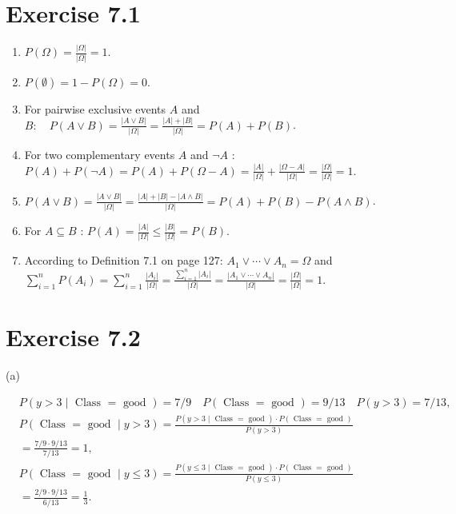 \documentclass[10pt]{book}
\begin{document}
\section*{Exercise 7.1}
\begin{enumerate}
  \item $P(\Omega)=\frac{|\Omega|}{|\Omega|}=1$.
  \item $P(\emptyset)=1-P(\Omega)=0$.
  \item For pairwise exclusive events $A$ and $B: \quad P(A \vee B)=\frac{|A \vee B|}{|\Omega|}=\frac{|A|+|B|}{|\Omega|}= P(A)+P(B)$.
  \item For two complementary events $A$ and $\neg A$ : $P(A)+P(\neg A)=P(A)+P(\Omega-A)= \frac{|A|}{|\Omega|}+\frac{|\Omega-A|}{|\Omega|}=\frac{|\Omega|}{|\Omega|}=1$.
  \item $P(A \vee B)=\frac{|A \vee B|}{|\Omega|}=\frac{|A|+|B|-|A \wedge B|}{|\Omega|}=P(A)+P(B)-P(A \wedge B)$.
  \item For $A \subseteq B$ : $P(A)=\frac{|A|}{|\Omega|} \leq \frac{|B|}{|\Omega|}=P(B)$.
  \item According to Definition 7.1 on page 127: $A_{1} \vee \cdots \vee A_{n}=\Omega$ and $\sum_{i=1}^{n} P\left(A_{i}\right)= \sum_{i=1}^{n} \frac{\left|A_{i}\right|}{|\Omega|}=\frac{\sum_{i=1}^{n}\left|A_{i}\right|}{|\Omega|}=\frac{\left|A_{1} \vee \cdots \vee A_{n}\right|}{|\Omega|}=\frac{|\Omega|}{|\Omega|}=1$.
\end{enumerate}


\section*{Exercise 7.2}
(a)

$$
\begin{aligned}
& P(y>3 \mid \text { Class }=\text { good })=7 / 9 \quad P(\text { Class }=\text { good })=9 / 13 \quad P(y>3)=7 / 13, \\
& P(\text { Class }=\text { good } \mid y>3)=\frac{P(y>3 \mid \text { Class }=\text { good }) \cdot P(\text { Class }=\text { good })}{P(y>3)} \\
& =\frac{7 / 9 \cdot 9 / 13}{7 / 13}=1, \\
& P(\text { Class }=\text { good } \mid y \leq 3)=\frac{P(y \leq 3 \mid \text { Class }=\text { good }) \cdot P(\text { Class }=\text { good })}{P(y \leq 3)} \\
& =\frac{2 / 9 \cdot 9 / 13}{6 / 13}=\frac{1}{3} .
\end{aligned}
$$
\end{document}
